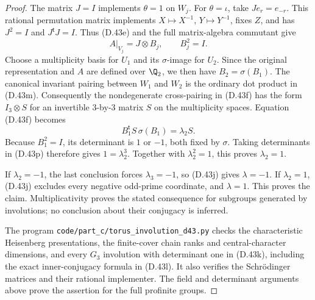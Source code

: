 \begin{proof}
The matrix $J=I$ implements $\theta=1$ on $W_j$.
For $\theta=\iota$, take $J e_r=e_{-r}$.
This rational permutation matrix implements
$X\mapsto X^{-1}$, $Y\mapsto Y^{-1}$, fixes $Z$,
and has $J^2=I$ and $J^{\mathsf t}J=I$.
Thus (D.43e) and the full matrix-algebra commutant
give
\[
                A|_{V_j}=J\otimes B_j,\qquad B_j^2=I.
                                                        \tag{D.43o}
\]
Choose a multiplicity basis for $U_1$ and its
$\sigma$-image for $U_2$.
Since the original representation and $A$ are
defined over $\Q_2$, we then have
$B_2=\sigma(B_1)$.
The canonical invariant pairing between $W_1$
and $W_2$ is the ordinary dot product in (D.43m).
Consequently the nondegenerate cross-pairing in
(D.43f) has the form $I_3\otimes S$ for an
invertible $3$-by-$3$ matrix $S$ on the multiplicity
spaces.  Equation (D.43f) becomes
\[
                 B_1^{\mathsf t}S\,\sigma(B_1)
                                      =\lambda_2 S.
                                                        \tag{D.43p}
\]
Because $B_1^2=I$, its determinant is $1$ or $-1$,
both fixed by $\sigma$.
Taking determinants in (D.43p) therefore gives
$1=\lambda_2^3$.  Together with $\lambda_2^2=1$,
this proves $\lambda_2=1$.

If $\lambda_2=-1$, the last conclusion forces
$\lambda_3=-1$, so (D.43j) gives $\lambda=-1$.
If $\lambda_2=1$, (D.43j) excludes every negative
odd-prime coordinate, and $\lambda=1$.
This proves the claim.  Multiplicativity proves
the stated consequence for subgroups generated
by involutions; no conclusion about their
conjugacy is inferred.

The program \texttt{code/part\_c/torus\_involution\_d43.py}
checks the characteristic Heisenberg presentations,
the finite-cover chain ranks and central-character
dimensions, and every $G_3$ involution with determinant
one in (D.43k), including the exact inner-conjugacy
formula in (D.43l).  It also verifies the
Schr\"odinger matrices and their rational implementer.
The field and determinant arguments above prove
the assertion for the full profinite groups.
\end{proof}
